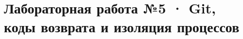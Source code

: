 
\setcounter{secnumdepth}{-3}

\section*{Лабораторная работа №5 · Git, коды возврата и изоляция процессов}
\tableofcontents


